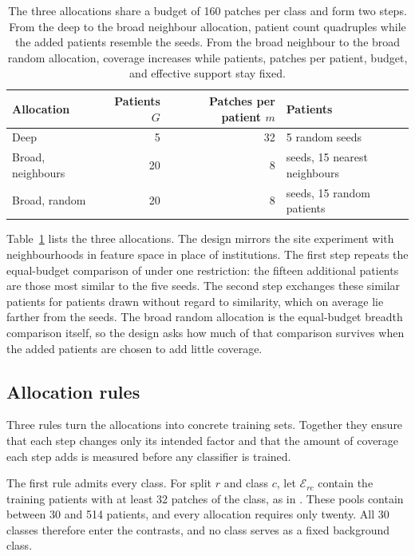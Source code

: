 \documentclass[11pt]{article}
\begin{document}
\begin{table}[htbp]
\centering
\renewcommand{\arraystretch}{1.15}
\begin{tabular}{@{}lrrl@{}}
\toprule
Allocation & Patients $G$ & Patches per patient $m$ & Patients \\
\midrule
Deep & 5 & 32 & 5 random seeds \\
Broad, neighbours & 20 & 8 & seeds, 15 nearest neighbours \\
Broad, random & 20 & 8 & seeds, 15 random patients \\
\bottomrule
\end{tabular}
\caption{The three allocations share a budget of 160 patches per class and form two steps. From the deep to the broad neighbour allocation, patient count quadruples while the added patients resemble the seeds. From the broad neighbour to the broad random allocation, coverage increases while patients, patches per patient, budget, and effective support stay fixed.}
\label{tab:allocations}
\end{table}

\noindent Table~\ref{tab:allocations} lists the three allocations. The design mirrors the site experiment \citep{queisler2026siteCoverage} with neighbourhoods in feature space in place of institutions. The first step repeats the equal-budget comparison of \citet{queisler2026effectiveSupport} under one restriction: the fifteen additional patients are those most similar to the five seeds. The second step exchanges these similar patients for patients drawn without regard to similarity, which on average lie farther from the seeds. The broad random allocation is the equal-budget breadth comparison itself, so the design asks how much of that comparison survives when the added patients are chosen to add little coverage.

\subsection{Allocation rules}
\label{sec:allocation}
Three rules turn the allocations into concrete training sets. Together they ensure that each step changes only its intended factor and that the amount of coverage each step adds is measured before any classifier is trained.

The first rule admits every class. For split $r$ and class $c$, let $\mathcal E_{rc}$ contain the training patients with at least 32 patches of the class, as in \citet{queisler2026effectiveSupport}. These pools contain between 30 and 514 patients, and every allocation requires only twenty. All 30 classes therefore enter the contrasts, and no class serves as a fixed background class.
\end{document}
